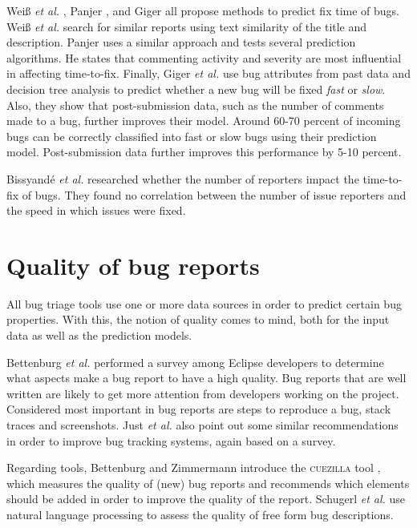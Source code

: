 Wei{\ss} \emph{et al.} \cite{Weiss2007}, Panjer \cite{Panjer2007}, and Giger \cite{Giger2010} all propose methods to predict fix time of bugs. Wei{\ss} \emph{et al.} search for similar reports using text similarity of the title and description. Panjer uses a similar approach and tests several prediction algorithms. He states that commenting activity and severity are most influential in affecting time-to-fix. Finally, Giger \emph{et al.} use bug attributes from past data and decision tree analysis to predict whether a new bug will be fixed \emph{fast} or \emph{slow}. Also, they show that post-submission data, such as the number of comments made to a bug, further improves their model. Around 60-70 percent of incoming bugs can be correctly classified into fast or slow bugs using their prediction model. Post-submission data further improves this performance by 5-10 percent.

Bissyand\'{e} \emph{et al.} \cite{Bissyande2012} researched whether the number of reporters impact the time-to-fix of bugs. They found no correlation between the number of issue reporters and the speed in which issues were fixed.

\section{Quality of bug reports}
\label{sec:quality_of_bug_reports}
All bug triage tools use one or more data sources in order to predict certain bug properties. With this, the notion of quality comes to mind, both for the input data as well as the prediction models.

Bettenburg \emph{et al.} \cite{Bettenburg2007, Zimmermann2010} performed a survey among Eclipse developers to determine what aspects make a bug report to have a high quality. Bug reports that are well written are likely to get more attention from developers working on the project. Considered most important in bug reports are steps to reproduce a bug, stack traces and screenshots.  Just \emph{et al.} \cite{Just2008} also point out some similar recommendations in order to improve bug tracking systems, again based on a survey. 

Regarding tools, Bettenburg and Zimmermann introduce the \textsc{cuezilla} tool \cite{Zimmermann2010}, which measures the quality of (new) bug reports and recommends which elements should be added in order to improve the quality of the report. Schugerl \emph{et al.} \cite{Schugerl2008} use natural language processing to assess the quality of free form bug descriptions. 

